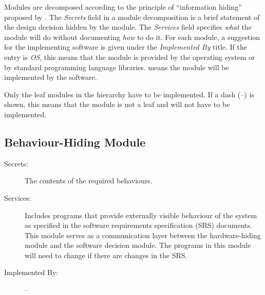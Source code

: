 \documentclass[12pt, titlepage]{article}
\newcommand{\mref}[1]{M\ref{#1}}
\begin{document}
Modules are decomposed according to the principle of ``information hiding'' proposed by \citet{ParnasEtAl1984}. The \emph{Secrets} field in a module decomposition is a brief statement of the design decision hidden by the module. The \emph{Services} field specifies \emph{what} the module will do without documenting \emph{how} to do it. For each module, a suggestion for the implementing software is given under the \emph{Implemented By} title. If the entry is \emph{OS}, this means that the module is provided by the operating system or by standard programming language libraries.  \emph{\progname{}} means the module will be implemented by the \progname{} software.

Only the leaf modules in the hierarchy have to be implemented. If a dash (\emph{--}) is shown, this means that the module is not a leaf and will not have to be implemented.



\subsection{Behaviour-Hiding Module}

\begin{description}
\item[Secrets:]The contents of the required behaviours.
\item[Services:]Includes programs that provide externally visible behaviour of the system as specified in the software requirements specification (SRS) documents. This module serves as a communication layer between the hardware-hiding module and the software decision module. The programs in this module will need to change if there are changes in the SRS.
\item[Implemented By:] --
\end{description}
\end{document}
